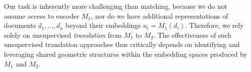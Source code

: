 Our task is inherently more challenging than matching, because we do not assume access to encoder $M_1$, nor do we have additional representations of documents ${d_1, \ldots, d_n}$ beyond their embeddings $u_i=M_1(d_i)$. Therefore, we rely solely on unsupervised \textit{translation} from $M_1$ to $M_2$. The effectiveness of such unsupervised translation approaches thus critically depends on identifying and leveraging shared geometric structures within the embedding spaces produced by $M_1$ and $M_2$.









